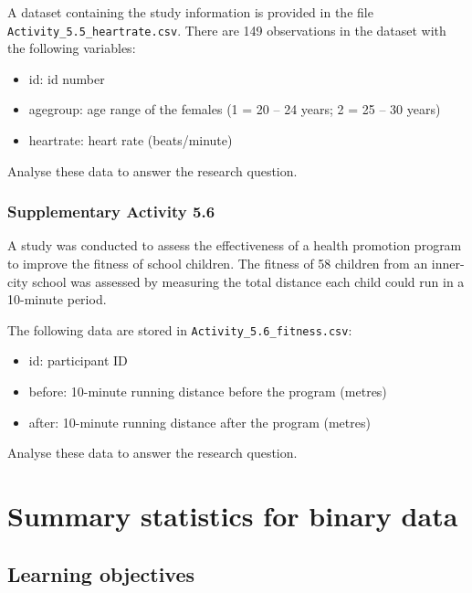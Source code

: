 \documentclass[
  a4paper,
]{memoir}
\providecommand{\tightlist}{%
  \setlength{\itemsep}{0pt}\setlength{\parskip}{0pt}}
\begin{document}
A dataset containing the study information is provided in the file
\texttt{Activity\_5.5\_heartrate.csv}. There are 149 observations in the
dataset with the following variables:

\begin{itemize}
\tightlist
\item
  id: id number
\item
  agegroup: age range of the females (1 = 20 -- 24 years; 2 = 25 -- 30
  years)
\item
  heartrate: heart rate (beats/minute)
\end{itemize}

Analyse these data to answer the research question.

\subsection{Supplementary Activity
5.6}\label{supplementary-activity-5.6}

A study was conducted to assess the effectiveness of a health promotion
program to improve the fitness of school children. The fitness of 58
children from an inner-city school was assessed by measuring the total
distance each child could run in a 10-minute period.

The following data are stored in \texttt{Activity\_5.6\_fitness.csv}:

\begin{itemize}
\tightlist
\item
  id: participant ID
\item
  before: 10-minute running distance before the program (metres)
\item
  after: 10-minute running distance after the program (metres)
\end{itemize}

Analyse these data to answer the research question.


\chapter{Summary statistics for binary
data}\label{summary-statistics-for-binary-data}

\section*{Learning objectives}\label{learning-objectives-5}
\end{document}
